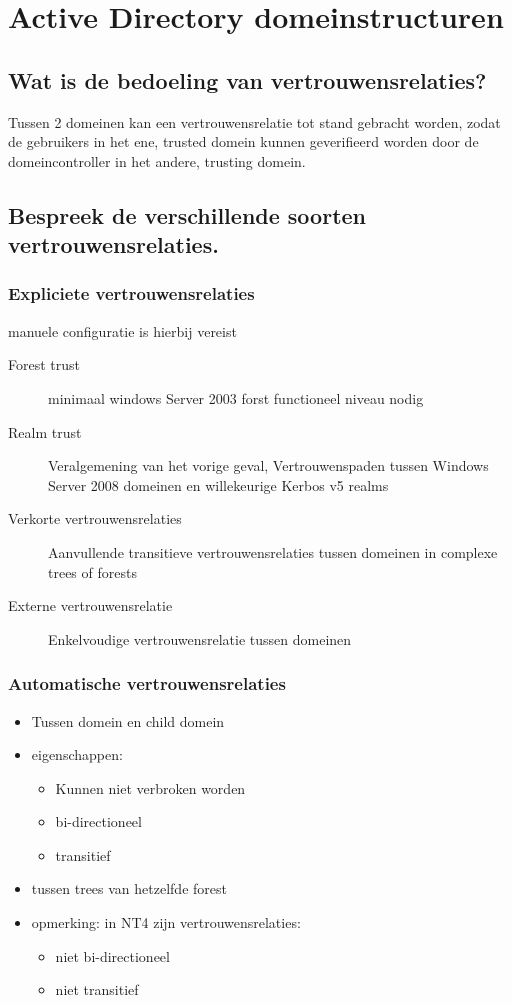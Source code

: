 \chapter{Active Directory domeinstructuren}

\section{Wat is de bedoeling van vertrouwensrelaties?}

Tussen 2 domeinen kan een vertrouwensrelatie tot stand gebracht worden, zodat de
gebruikers in het ene, trusted domein kunnen geverifieerd worden door de
domeincontroller in het andere, trusting domein.

\section{Bespreek de verschillende soorten vertrouwensrelaties.}

\subsection{Expliciete vertrouwensrelaties}

manuele configuratie is hierbij vereist

\begin{description}
	\item[Forest trust] minimaal windows Server 2003 forst functioneel
		niveau nodig
	\item[Realm trust] Veralgemening van het vorige geval, Vertrouwenspaden
		tussen Windows Server 2008 domeinen en willekeurige Kerbos v5
		realms
	\item[Verkorte vertrouwensrelaties] Aanvullende transitieve
		vertrouwensrelaties tussen domeinen in complexe trees of forests
	\item[Externe vertrouwensrelatie] Enkelvoudige vertrouwensrelatie tussen
		domeinen
\end{description}

\subsection{Automatische vertrouwensrelaties}

\begin{itemize}
	\item Tussen domein en child domein
	\item eigenschappen:
		\begin{itemize}
			\item Kunnen niet verbroken worden
			\item bi-directioneel
			\item transitief
		\end{itemize}
	\item tussen trees van hetzelfde forest
	\item opmerking: in NT4 zijn vertrouwensrelaties:
		\begin{itemize}
			\item niet bi-directioneel
			\item niet transitief
		\end{itemize}
\end{itemize}

